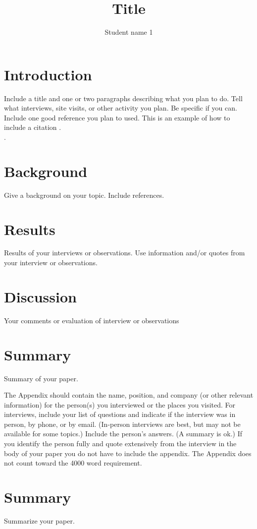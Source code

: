 \documentclass[journal]{IEEEtran}
\begin{document}
\title{Title}

\author{Student name 1}%
        

\maketitle


\section{Introduction }
Include a title and one or two paragraphs describing what you plan to do. Tell what interviews, site visits, or other activity you plan. Be specific if you can. Include  one good reference you plan to used. This is an example of how to include a citation \cite{williams1989style}.  \\.

\section {Background}
Give a background on your topic. Include references. 

\section{Results}
Results of your interviews or observations. Use information and/or quotes from your interview or observations.

\section{Discussion}
Your comments or evaluation of interview or observations

\section{Summary}
Summary of your paper.

\appendix
The Appendix should contain the name, position, and company (or other relevant information) for the person(s) you interviewed or the places you visited. For interviews, include your list of questions and indicate if the interview was in person, by phone, or by email. (In-person interviews are best, but may not be available for some topics.) Include the person's answers. (A summary is ok.) If you identify the person fully and quote extensively from the interview in the body of your paper you do not have to include the appendix. The Appendix does not count toward the 4000 word requirement.


\section{Summary}
Summarize your paper.




\printbibliography

\end{document}
